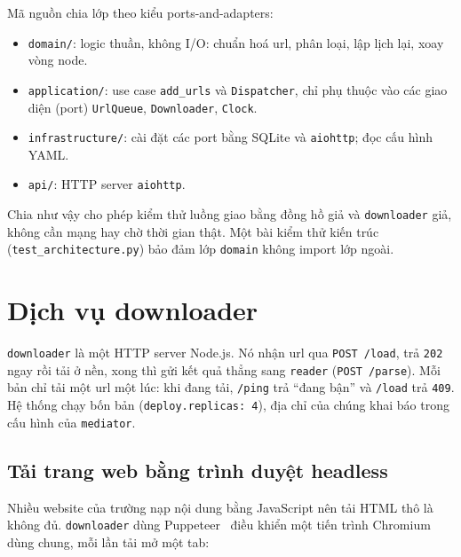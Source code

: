 \documentclass[12pt,a4paper]{report}
\begin{document}
Mã nguồn chia lớp theo kiểu ports-and-adapters:

\begin{itemize}
  \item \texttt{domain/}: logic thuần, không I/O: chuẩn hoá url, phân loại, lập lịch lại, xoay vòng node.
  \item \texttt{application/}: use case \texttt{add\_\allowbreak{}urls} và \texttt{Dispatcher}, chỉ phụ thuộc vào các giao diện
        (port) \texttt{UrlQueue}, \texttt{Downloader}, \texttt{Clock}.
  \item \texttt{infrastructure/}: cài đặt các port bằng SQLite và \texttt{aiohttp}; đọc cấu hình YAML.
  \item \texttt{api/}: HTTP server \texttt{aiohttp}.
\end{itemize}

Chia như vậy cho phép kiểm thử luồng giao bằng đồng hồ giả và \texttt{downloader} giả, không cần mạng hay chờ thời gian
thật. Một bài kiểm thử kiến trúc (\texttt{test\_\allowbreak{}architecture.py}) bảo đảm lớp \texttt{domain} không import lớp ngoài.

\section{Dịch vụ downloader}

\texttt{downloader} là một HTTP server Node.js. Nó nhận url qua \texttt{POST /load}, trả \texttt{202} ngay rồi tải ở
nền, xong thì gửi kết quả thẳng sang \texttt{reader} (\texttt{POST /parse}). Mỗi bản chỉ tải một url một lúc: khi đang
tải, \texttt{/ping} trả ``đang bận'' và \texttt{/load} trả \texttt{409}. Hệ thống chạy bốn bản
(\texttt{deploy.replicas: 4}), địa chỉ của chúng khai báo trong cấu hình của \texttt{mediator}.

\subsection{Tải trang web bằng trình duyệt headless}

Nhiều website của trường nạp nội dung bằng JavaScript nên tải HTML thô là không đủ. \texttt{downloader} dùng Puppeteer~\cite{puppeteer}
điều khiển một tiến trình Chromium dùng chung, mỗi lần tải mở một tab:
\end{document}
